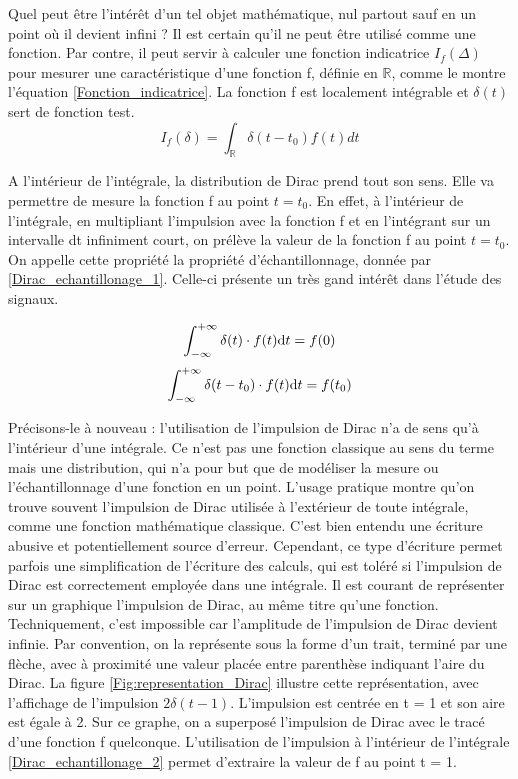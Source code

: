 	Quel peut être l'intérêt d'un tel objet mathématique, nul partout sauf en un point où il devient infini ? Il est certain qu'il ne peut être utilisé comme une fonction. Par contre, il peut servir à calculer une fonction indicatrice $I_{f}(\Delta)$ pour mesurer une caractéristique d'une fonction f, définie en $\mathbb{R}$, comme le montre l'équation \ref{Fonction_indicatrice}. La fonction f est localement intégrable et $\delta(t)$ sert de fonction test.
	\begin{equation}\label{Fonction_indicatrice}
	I_{f}(\delta)=\int_{\mathbb{R}}\delta(t-t_0)f(t)dt
	\end{equation}
	
	A l'intérieur de l'intégrale, la distribution de Dirac prend tout son sens. Elle va permettre de mesure la fonction f au point $t = t_0$. En effet, à l'intérieur de l'intégrale, en multipliant l'impulsion avec la fonction f et en l'intégrant sur un intervalle dt infiniment court, on prélève la valeur de la fonction f au point $t = t_0$. On appelle cette propriété la propriété d'échantillonnage, donnée par \ref{Dirac_echantillonage_1}. Celle-ci présente un très gand intérêt dans l'étude des signaux.
	
	\begin{equation}\label{Dirac_echantillonage_1}
	\int_{-\infty}^{+\infty} \delta (t) \cdot f(t) \mathrm{d} t = f(0) 	 
	\end{equation}
	\begin{equation}\label{Dirac_echantillonage_2} 	
	\int_{-\infty}^{+\infty} \delta (t-t_{0}) \cdot f(t) \mathrm{d} t = f(t_{0}) 
	\end{equation}
	
	Précisons-le à nouveau : l'utilisation de l'impulsion de Dirac n'a de sens qu'à l'intérieur d'une intégrale. Ce n'est pas une fonction classique au sens du terme mais une distribution, qui n'a pour but que de modéliser la mesure ou l'échantillonnage d'une fonction en un point. L'usage pratique montre qu'on trouve souvent l'impulsion de Dirac utilisée à l'extérieur de toute intégrale, comme une fonction mathématique classique. C'est bien entendu une écriture abusive et potentiellement source d'erreur. Cependant, ce type d'écriture permet parfois une simplification de l'écriture des calculs, qui est toléré si l'impulsion de Dirac est correctement employée dans une intégrale. Il est courant de représenter sur un graphique l'impulsion de Dirac, au même titre qu'une fonction. Techniquement, c'est impossible car l'amplitude de l'impulsion de Dirac devient infinie. Par convention, on la représente sous la forme d'un trait, terminé par une flèche, avec à proximité une valeur placée entre parenthèse indiquant l'aire du Dirac. La figure \ref{Fig:representation_Dirac} illustre cette représentation, avec l'affichage de l'impulsion $2\delta(t-1)$. L'impulsion est centrée en t = 1 et son aire est égale à 2. Sur ce graphe, on a superposé l'impulsion de Dirac avec le tracé d'une fonction f quelconque. L'utilisation de l'impulsion à l'intérieur de l'intégrale \ref{Dirac_echantillonage_2} permet d'extraire la valeur de f au point t = 1.
	
